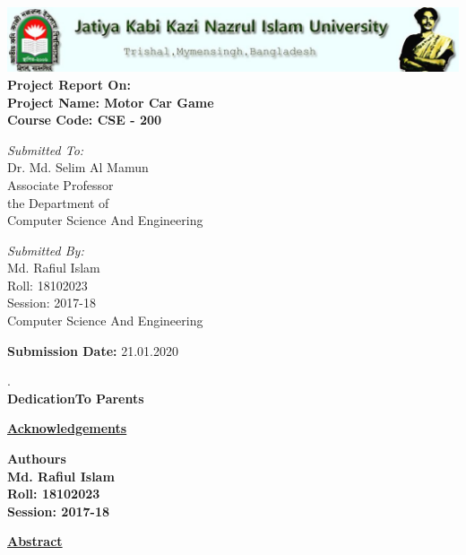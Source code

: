 \documentclass[12pt,a4paper]{report}
\begin{document}
	\begin{titlepage}
		\begin{center}
			\includegraphics[width=\linewidth]{JKKNIU} \\
			\vspace{1cm}
			\large{ \textbf{Project Report On: \\
					\color{blue}{SoftWare Development Project II\\}\large{ \textbf{\color{black} Project Name: Motor Car Game\\}
					\color{black}Course Code: CSE - 200}}}
		\end{center}
		\vspace{7cm}
		\begin{minipage}{0.5\textwidth} 
			\huge{\textit{Submitted To: }} \\
			\large{Dr. Md. Selim Al Mamun} \\
			Associate Professor \\the Department of \\
			Computer Science And Engineering
		\end{minipage}
		\begin{minipage}{0.5\textwidth}
			\begin{flushright}
				\vspace{5cm} 
				\huge{\textit{Submitted By: }} \\
				\large{Md. Rafiul Islam} \\
				Roll: 18102023 \\
				Session: 2017-18 \\
				Computer Science And Engineering
			\end{flushright}
		\end{minipage}
		\vspace{2cm}
		\begin{center}
			\textbf{Submission Date:} 21.01.2020
		\end{center}
	\end{titlepage}\newpage
	\begin{center}
		.\\
		\vspace{10cm}
		\huge{\textbf{\color{blue}DedicationTo Parents}}
	\end{center}\newpage
	\begin{center}
		\large{\textbf{{\underline{\color{blue}Acknowledgements}}}}
	\end{center}
	\vspace{18cm}
	\large{\textbf{
	Authours \\ 
	Md. Rafiul Islam \\
	Roll: 18102023 \\
	Session: 2017-18}}
	\newpage
	\begin{center}
		\large{\textbf{\underline{Abstract}}} \\
	\end{center}
	
\end{document}
